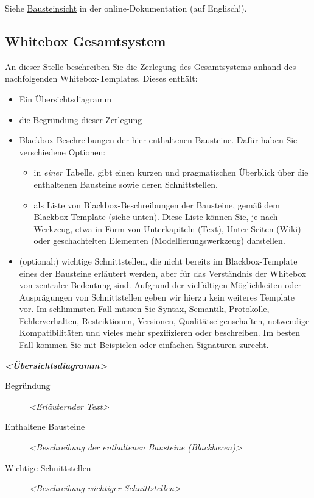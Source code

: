 \documentclass[
]{article}
\begin{document}
Siehe \href{https://docs.arc42.org/section-5/}{Bausteinsicht} in der
online-Dokumentation (auf Englisch!).

\hypertarget{_whitebox_gesamtsystem}{%
\subsection{Whitebox Gesamtsystem}\label{_whitebox_gesamtsystem}}

An dieser Stelle beschreiben Sie die Zerlegung des Gesamtsystems anhand
des nachfolgenden Whitebox-Templates. Dieses enthält:

\begin{itemize}
\item
  Ein Übersichtsdiagramm
\item
  die Begründung dieser Zerlegung
\item
  Blackbox-Beschreibungen der hier enthaltenen Bausteine. Dafür haben
  Sie verschiedene Optionen:

  \begin{itemize}
  \item
    in \emph{einer} Tabelle, gibt einen kurzen und pragmatischen
    Überblick über die enthaltenen Bausteine sowie deren Schnittstellen.
  \item
    als Liste von Blackbox-Beschreibungen der Bausteine, gemäß dem
    Blackbox-Template (siehe unten). Diese Liste können Sie, je nach
    Werkzeug, etwa in Form von Unterkapiteln (Text), Unter-Seiten (Wiki)
    oder geschachtelten Elementen (Modellierungswerkzeug) darstellen.
  \end{itemize}
\item
  (optional:) wichtige Schnittstellen, die nicht bereits im
  Blackbox-Template eines der Bausteine erläutert werden, aber für das
  Verständnis der Whitebox von zentraler Bedeutung sind. Aufgrund der
  vielfältigen Möglichkeiten oder Ausprägungen von Schnittstellen geben
  wir hierzu kein weiteres Template vor. Im schlimmsten Fall müssen Sie
  Syntax, Semantik, Protokolle, Fehlerverhalten, Restriktionen,
  Versionen, Qualitätseigenschaften, notwendige Kompatibilitäten und
  vieles mehr spezifizieren oder beschreiben. Im besten Fall kommen Sie
  mit Beispielen oder einfachen Signaturen zurecht.
\end{itemize}

\emph{\textbf{\textless Übersichtsdiagramm\textgreater{}}}

\begin{description}
\item[Begründung]
\emph{\textless Erläuternder Text\textgreater{}}
\item[Enthaltene Bausteine]
\emph{\textless Beschreibung der enthaltenen Bausteine
(Blackboxen)\textgreater{}}
\item[Wichtige Schnittstellen]
\emph{\textless Beschreibung wichtiger Schnittstellen\textgreater{}}
\end{description}
\end{document}
